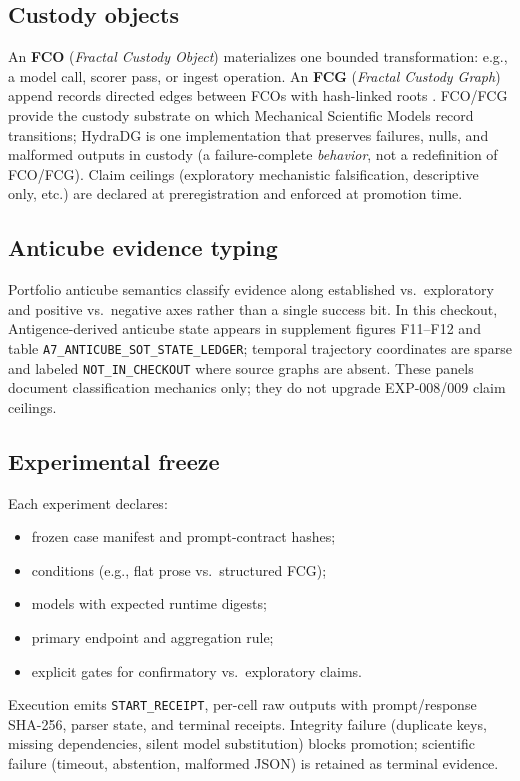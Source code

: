 \documentclass{article}
\begin{document}
\subsection{Custody objects}

An \textbf{FCO} (\emph{Fractal Custody Object}) materializes one bounded transformation: e.g., a model call, scorer pass, or ingest operation.
An \textbf{FCG} (\emph{Fractal Custody Graph}) append records directed edges between FCOs with hash-linked roots \cite{laurie2013ct}.
FCO/FCG provide the custody substrate on which Mechanical Scientific Models record transitions; HydraDG is one implementation that preserves failures, nulls, and malformed outputs in custody (a failure-complete \emph{behavior}, not a redefinition of FCO/FCG).
Claim ceilings (exploratory mechanistic falsification, descriptive only, etc.) are declared at preregistration and enforced at promotion time.

\subsection{Anticube evidence typing}

Portfolio anticube semantics classify evidence along established vs.\ exploratory and positive vs.\ negative axes rather than a single success bit.
In this checkout, Antigence-derived anticube state appears in supplement figures F11--F12 and table \texttt{A7\_ANTICUBE\_SOT\_STATE\_LEDGER}; temporal trajectory coordinates are sparse and labeled \texttt{NOT\_IN\_CHECKOUT} where source graphs are absent.
These panels document classification mechanics only; they do not upgrade EXP-008/009 claim ceilings.

\subsection{Experimental freeze}

Each experiment declares:
\begin{itemize}
  \item frozen case manifest and prompt-contract hashes;
  \item conditions (e.g., flat prose vs.\ structured FCG);
  \item models with expected runtime digests;
  \item primary endpoint and aggregation rule;
  \item explicit gates for confirmatory vs.\ exploratory claims.
\end{itemize}
Execution emits \texttt{START\_RECEIPT}, per-cell raw outputs with prompt/response SHA-256, parser state, and terminal receipts.
Integrity failure (duplicate keys, missing dependencies, silent model substitution) blocks promotion; scientific failure (timeout, abstention, malformed JSON) is retained as terminal evidence.
\end{document}
